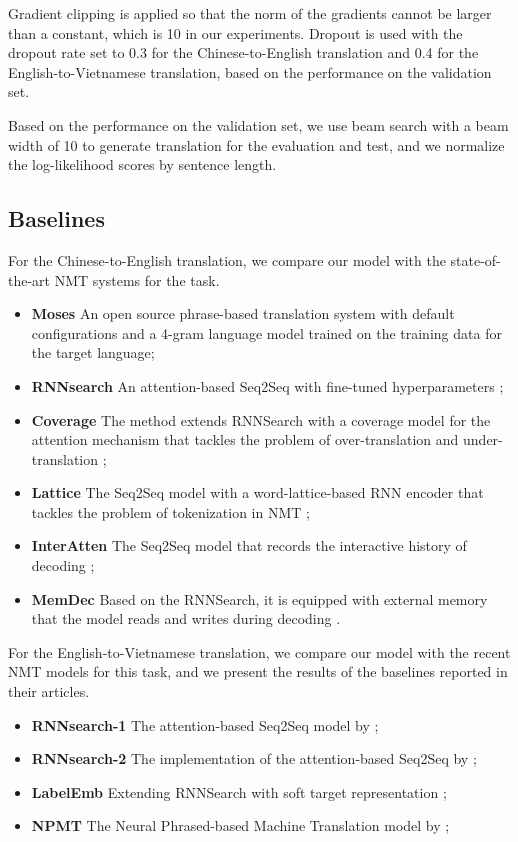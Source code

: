 \documentclass[11pt]{article}
\begin{document}
\begin{CJK}{UTF8}{gbsn}
Gradient clipping is applied so that the norm of the gradients cannot be larger than a constant, which is 10 in our experiments. Dropout is used with the dropout rate set to 0.3 for the Chinese-to-English translation and 0.4 for the English-to-Vietnamese translation, based on the performance on the validation set. 

Based on the performance on the validation set, we use beam search with a beam width of 10 to generate translation for the evaluation and test, and we normalize the log-likelihood scores by sentence length.

\subsection{Baselines}

For the Chinese-to-English translation, we compare our model with the state-of-the-art NMT systems for the task.
\begin{itemize}
\item \textbf{Moses} An open source phrase-based translation system
with default configurations and a 4-gram language model trained on the training data for the target language;
\item \textbf{RNNsearch} An attention-based Seq2Seq with fine-tuned hyperparameters \citep{attention};
\item \textbf{Coverage} The method extends RNNSearch with a coverage model for the attention mechanism that tackles the problem of over-translation and under-translation \citep{coverage};
\item \textbf{Lattice} The Seq2Seq model with a word-lattice-based RNN encoder that tackles the problem of tokenization in NMT \citep{lattice};
\item \textbf{InterAtten} The Seq2Seq model that records the interactive history of decoding \citep{interactive};
\item \textbf{MemDec} Based on the RNNSearch, it is equipped with external memory that the model reads and writes during decoding \citep{memdec}.
\end{itemize}

For the English-to-Vietnamese translation, we compare our model with the recent NMT models for this task, and we present the results of the baselines reported in their articles.
\begin{itemize}
\item \textbf{RNNsearch-1} The attention-based Seq2Seq model by \citet{luong2015stanford};
\item \textbf{RNNsearch-2} The implementation of the attention-based Seq2Seq by \citet{nplm};
\item \textbf{LabelEmb} Extending RNNSearch with soft target representation \citep{labelemb};
\item \textbf{NPMT} The Neural Phrased-based Machine Translation model by \citet{nplm};
\end{itemize}


\end{CJK}
\end{document}
